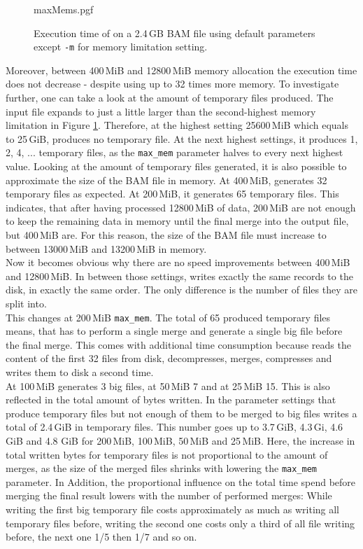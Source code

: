 \begin{figure}
        {maxMems.pgf}
    \caption{Execution time of \sort on a 2.4\,GB BAM file using default parameters except \texttt{-m} for memory limitation setting. }
    \label{fig:maxMems}
\end{figure}
Moreover, between 400\,MiB and 12800\,MiB memory allocation the execution time does not decrease - despite \sort using up to 32 times more memory. To investigate further, one can take a look at the amount of temporary files produced. The input file expands to just a little larger than the second-highest memory limitation in Figure \ref{fig:maxMems}. Therefore, at the highest setting 25600\,MiB which equals to 25\,GiB, \sort produces no temporary file. At the next highest settings, it produces 1, 2, 4, ... temporary files, as the \texttt{max\_mem} parameter halves to every next highest value. Looking at the amount of temporary files generated, it is also possible to approximate the size of the BAM file in memory. At 400\,MiB, \sort generates 32 temporary files as expected. At 200\,MiB, it generates 65 temporary files. This indicates, that after having processed 12800\,MiB of data, 200\,MiB are not enough to keep the remaining data in memory until the final merge into the output file, but 400\,MiB are. For this reason, the size of the BAM file must increase to between 13000\,MiB and 13200\,MiB in memory. \\
Now it becomes obvious why there are no speed improvements between 400\,MiB and 12800\,MiB. In between those settings, \sort writes exactly the same records to the disk, in exactly the same order. The only difference is the number of files they are split into. \\
This changes at 200\,MiB \texttt{max\_mem}. The total of 65 produced temporary files means, that \sort has to perform a single merge and generate a single big file before the final merge. This comes with additional time consumption because \sort reads the content of the first 32 files from disk, decompresses, merges, compresses  and writes them to disk a second time. \\
At 100\,MiB \sort generates 3 big files, at 50\,MiB 7 and at 25\,MiB 15. This is also reflected in the total amount of bytes written. In the parameter settings that produce temporary files but not enough of them to be merged to big files \sort writes a total of 2.4\,GiB in temporary files. This number goes up to 3.7\,GiB, 4.3\,Gi, 4.6\,GiB and 4.8 GiB for 200\,MiB, 100\,MiB, 50\,MiB and 25\,MiB. Here, the increase in total written bytes for temporary files is not proportional to the amount of merges, as the size of the merged files shrinks with lowering the \texttt{max\_mem} parameter. In Addition, the proportional influence on the total time spend before merging the final result lowers with the number of performed merges: While writing the first big temporary file costs approximately as much as writing all temporary files before, writing the second one costs only a third of all file writing before, the next one 1/5 then 1/7 and so on.\\
